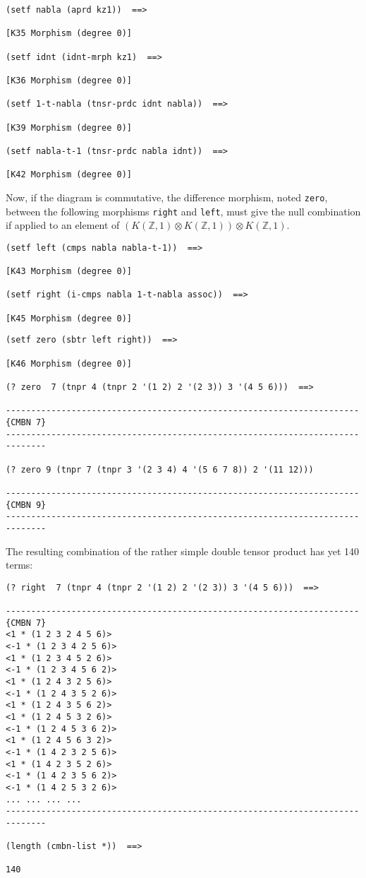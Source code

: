 {\footnotesize\begin{verbatim}
(setf nabla (aprd kz1))  ==>

[K35 Morphism (degree 0)]

(setf idnt (idnt-mrph kz1)  ==>

[K36 Morphism (degree 0)]

(setf 1-t-nabla (tnsr-prdc idnt nabla))  ==>

[K39 Morphism (degree 0)]

(setf nabla-t-1 (tnsr-prdc nabla idnt))  ==>

[K42 Morphism (degree 0)]
\end{verbatim}}
Now, if the diagram is commutative, the difference morphism, noted {\tt zero}, between
the following morphisms {\tt right} and {\tt left}, must give the null combination if applied to an
element of $(K(\mathbb{Z}, 1) \otimes K(\mathbb{Z}, 1)) \otimes K(\mathbb{Z}, 1).$
{\footnotesize\begin{verbatim}
(setf left (cmps nabla nabla-t-1))  ==>

[K43 Morphism (degree 0)]

(setf right (i-cmps nabla 1-t-nabla assoc))  ==>

[K45 Morphism (degree 0)]
\end{verbatim}}
\newpage
{\footnotesize\begin{verbatim}
(setf zero (sbtr left right))  ==>

[K46 Morphism (degree 0)]

(? zero  7 (tnpr 4 (tnpr 2 '(1 2) 2 '(2 3)) 3 '(4 5 6)))  ==>

----------------------------------------------------------------------{CMBN 7}
------------------------------------------------------------------------------

(? zero 9 (tnpr 7 (tnpr 3 '(2 3 4) 4 '(5 6 7 8)) 2 '(11 12)))

----------------------------------------------------------------------{CMBN 9}
------------------------------------------------------------------------------
\end{verbatim}}
The resulting combination of the rather simple double tensor product has yet
140 terms:
{\footnotesize\begin{verbatim}
(? right  7 (tnpr 4 (tnpr 2 '(1 2) 2 '(2 3)) 3 '(4 5 6)))  ==>

----------------------------------------------------------------------{CMBN 7}
<1 * (1 2 3 2 4 5 6)>
<-1 * (1 2 3 4 2 5 6)>
<1 * (1 2 3 4 5 2 6)>
<-1 * (1 2 3 4 5 6 2)>
<1 * (1 2 4 3 2 5 6)>
<-1 * (1 2 4 3 5 2 6)>
<1 * (1 2 4 3 5 6 2)>
<1 * (1 2 4 5 3 2 6)>
<-1 * (1 2 4 5 3 6 2)>
<1 * (1 2 4 5 6 3 2)>
<-1 * (1 4 2 3 2 5 6)>
<1 * (1 4 2 3 5 2 6)>
<-1 * (1 4 2 3 5 6 2)>
<-1 * (1 4 2 5 3 2 6)>
... ... ... ...
------------------------------------------------------------------------------

(length (cmbn-list *))  ==>

140
\end{verbatim}}
\newpage

